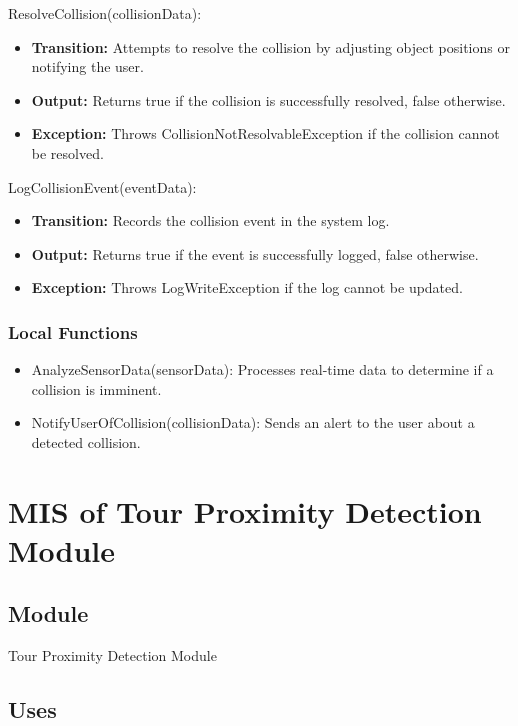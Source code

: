 \documentclass[12pt, titlepage]{article}
\begin{document}
\noindent ResolveCollision(collisionData):
\begin{itemize}
    \item \textbf{Transition:} Attempts to resolve the collision by adjusting object positions or notifying the user.
    \item \textbf{Output:} Returns true if the collision is successfully resolved, false otherwise.
    \item \textbf{Exception:} Throws CollisionNotResolvableException if the collision cannot be resolved.
\end{itemize}

\noindent LogCollisionEvent(eventData):
\begin{itemize}
    \item \textbf{Transition:} Records the collision event in the system log.
    \item \textbf{Output:} Returns true if the event is successfully logged, false otherwise.
    \item \textbf{Exception:} Throws LogWriteException if the log cannot be updated.
\end{itemize}

\subsubsection{Local Functions}

\begin{itemize}
    \item AnalyzeSensorData(sensorData): Processes real-time data to determine if a collision is imminent.
    \item NotifyUserOfCollision(collisionData): Sends an alert to the user about a detected collision.
\end{itemize}

\newpage

\section{MIS of Tour Proximity Detection Module} \label{Module_TourProximityDetection}

\subsection{Module}

Tour Proximity Detection Module

\subsection{Uses}
\end{document}
